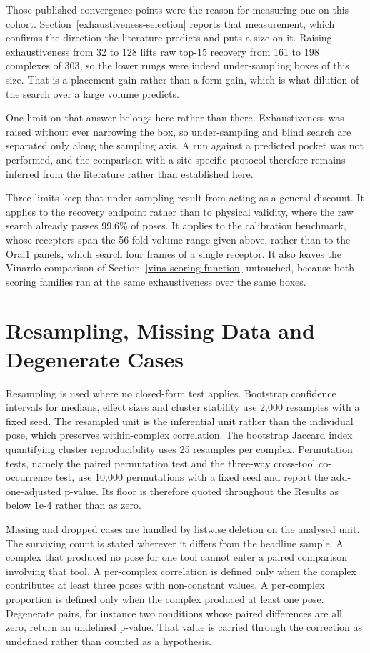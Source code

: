 Those published convergence points were the reason for measuring one on this cohort. Section~\ref{exhaustiveness-selection} reports that measurement, which confirms the direction the literature predicts and puts a size on it. Raising exhaustiveness from 32 to 128 lifts raw top-15 recovery from 161 to 198 complexes of 303, so the lower rungs were indeed under-sampling boxes of this size. That is a placement gain rather than a form gain, which is what dilution of the search over a large volume predicts.

One limit on that answer belongs here rather than there. Exhaustiveness was raised without ever narrowing the box, so under-sampling and blind search are separated only along the sampling axis. A run against a predicted pocket was not performed, and the comparison with a site-specific protocol therefore remains inferred from the literature rather than established here.

Three limits keep that under-sampling result from acting as a general discount. It applies to the recovery endpoint rather than to physical validity, where the raw search already passes 99.6\% of poses. It applies to the calibration benchmark, whose receptors span the 56-fold volume range given above, rather than to the Orai1 panels, which search four frames of a single receptor. It also leaves the Vinardo comparison of Section~\ref{vina-scoring-function} untouched, because both scoring families ran at the same exhaustiveness over the same boxes.

\hypertarget{resampling-and-missing-data}{%
\section{Resampling, Missing Data and Degenerate Cases}\label{resampling-and-missing-data}}

Resampling is used where no closed-form test applies. Bootstrap confidence intervals for medians, effect sizes and cluster stability use 2,000 resamples with a fixed seed. The resampled unit is the inferential unit rather than the individual pose, which preserves within-complex correlation. The bootstrap Jaccard index quantifying cluster reproducibility uses 25 resamples per complex. Permutation tests, namely the paired permutation test and the three-way cross-tool co-occurrence test, use 10,000 permutations with a fixed seed and report the add-one-adjusted p-value. Its floor is therefore quoted throughout the Results as below 1e-4 rather than as zero.

Missing and dropped cases are handled by listwise deletion on the analysed unit. The surviving count is stated wherever it differs from the headline sample. A complex that produced no pose for one tool cannot enter a paired comparison involving that tool. A per-complex correlation is defined only when the complex contributes at least three poses with non-constant values. A per-complex proportion is defined only when the complex produced at least one pose. Degenerate pairs, for instance two conditions whose paired differences are all zero, return an undefined p-value. That value is carried through the correction as undefined rather than counted as a hypothesis.

